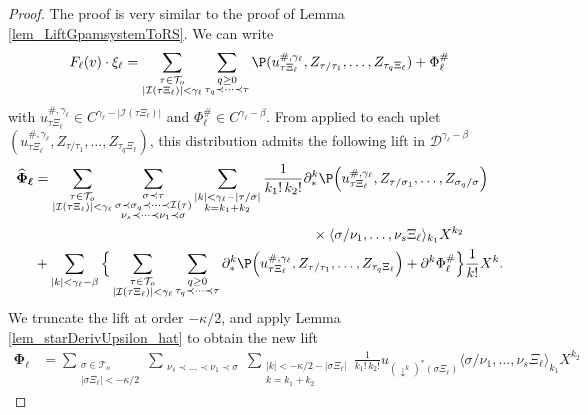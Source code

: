 \documentclass[11pt]{preprint}
\newcommand{\mcI}{\mathcal{I}}
\newcommand{\mcD}{\mathcal{D}}
\newcommand{\mcT}{\mathcal{T}}
\renewcommand{\lg}{\langle}
\newcommand{\rg}{\rangle}
\begin{document}
	\begin{proof}
		The proof is very similar to the proof of Lemma \ref{lem_LiftGpamsystemToRS}. We can write 
		$$
		F_\ell(v)\cdot \xi_\ell =  \sum_{\substack{\tau\in\mcT_o \\  |\mcI(\tau\Xi_\ell)|<\gamma_\ell}} \sum_{\substack{q\geq 0\\ \tau_q\prec\dots\prec\tau}} \P( u_{\tau\Xi_\ell}^{\#,\gamma_\ell}, Z_{\tau/\tau_1},\dots, Z_{\tau_q\Xi_\ell}     )  + \Phi_\ell^{\#}
		$$
		with $u_{\tau\Xi_\ell}^{\#,\gamma_\ell}\in C^{\gamma_\ell-|\mcI(\tau\Xi_\ell)|}$ and $\Phi_\ell^\#\in C^{\gamma_\ell-\beta}$.
		From \cite[Theorem 1]{LocalExpansionsParacSystems} applied to each uplet $(u_{\tau\Xi_\ell}^{\#,\gamma_\ell}, Z_{\tau/\tau_1},\dots, Z_{\tau_q\Xi_\ell} )$, this distribution admits the following lift in $\mcD^{\gamma_\ell-\beta}$
		\begin{align*}
			{\boldsymbol{\widehat\Phi_\ell}} &= \sum_{\substack{\tau\in\mcT_o \\ |\mcI(\tau\Xi_\ell)|<\gamma_\ell }}\sum_{\substack{ \sigma\prec\tau \\ \sigma \prec\sigma_q \prec\dots\prec\mcI(\tau)  \\ \nu_s\prec\dots\prec\nu_1\prec\sigma  }} \sum_{\substack{|k|<\gamma_\ell- |\tau/\sigma| \\ k=k_1+k_2 }} \frac{1}{k_1!\, k_2!}\partial^k_*\P\Big(u_{\tau\Xi_\ell}^{\#,\gamma_\ell}, Z_{\tau/\sigma_1},\dots, Z_{\sigma_q/\sigma}\Big) 
			\\
			&\hspace{7cm} \times \lg {\sigma/\nu_1},\dots , \nu_s\Xi_\ell  \rg_{k_1}X^{k_2} 
			\\
			&+\sum_{|k|<\gamma_\ell-\beta} \Big\{   \sum_{\substack{ \tau\in\mcT_o \\  |\mcI(\tau\Xi_\ell)|<\gamma_\ell}} \sum_{\substack{q\geq 0\\ \tau_q\prec\dots\prec\tau}} \partial^k_*\P\Big( u_{\tau\Xi_\ell}^{\#,\gamma_\ell}, Z_{\tau/\tau_1},\dots, Z_{\tau_q\Xi_\ell}     \Big)  + \partial^k \Phi_\ell^{\#}\Big\} \frac{1}{k!}X^k.
		\end{align*}
		We truncate the lift at order $-\kappa/2$, and apply Lemma \ref{lem_starDerivUpsilon_hat} to obtain the new lift
		\begin{align*}
			\boldsymbol{\Phi_\ell} &= \sum_{\substack{\sigma\in\mcT_o \\ |\sigma\Xi_\ell|< -\kappa/2 }}\sum_{\substack{ \nu_s\prec\dots\prec\nu_1\prec\sigma  }} \sum_{\substack{|k|<-\kappa/2- |\sigma\Xi_\ell| \\ k=k_1+k_2 }} \frac{1}{k_1!\, k_2!} u_{(\downarrow^k)^*(\sigma\Xi_\ell)} \lg {\sigma/\nu_1},\dots , \nu_s\Xi_\ell  \rg_{k_1}X^{k_2}

\end{align*}
\end{proof}
\end{document}
